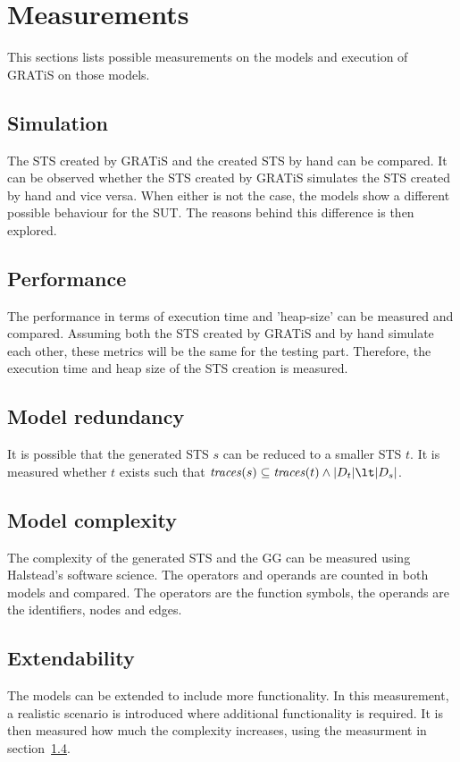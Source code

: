 \section{Measurements}\label{sec:measurements}

This sections lists possible measurements on the models and execution of GRATiS on those models.

\subsection{Simulation}
The STS created by GRATiS and the created STS by hand can be compared. It can be observed whether the STS created by GRATiS simulates the STS created by hand and vice versa. When either is not the case, the models show a different possible behaviour for the SUT. The reasons behind this difference is then explored.

\subsection{Performance}
The performance in terms of execution time and 'heap-size' can be measured and compared. Assuming both the STS created by GRATiS and by hand simulate each other, these metrics will be the same for the testing part. Therefore, the execution time and heap size of the STS creation is measured.


\subsection{Model redundancy}
It is possible that the generated STS $s$ can be reduced to a smaller STS $t$. It is measured whether $t$ exists such that $\mathit{traces}(s) \subseteq \mathit{traces}(t) \land |\Switches_t| \lt |\Switches_s|$.

\subsection{Model complexity}\label{sec:complexity_measurement}
The complexity of the generated STS and the GG can be measured using Halstead's software science. The operators and operands are counted in both models and compared. The operators are the function symbols, the operands are the identifiers, nodes and edges. 

\subsection{Extendability}
The models can be extended to include more functionality. In this measurement, a realistic scenario is introduced where additional functionality is required. It is then measured how much the complexity increases, using the measurment in section~\ref{sec:complexity_measurement}.
